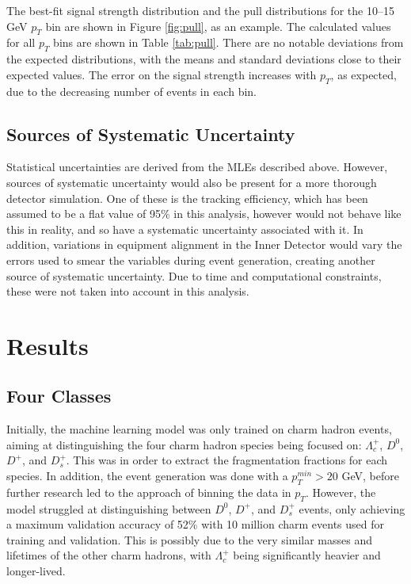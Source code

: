 \documentclass[12pt]{article}
\begin{document}
The best-fit signal strength distribution and the pull distributions for the 10--15 GeV $p_T$ bin are shown in Figure \ref{fig:pull}, as an example. The calculated values for all $p_T$ bins are shown in Table \ref{tab:pull}. There are no notable deviations from the expected distributions, with the means and standard deviations close to their expected values. The error on the signal strength increases with $p_T$, as expected, due to the decreasing number of events in each bin.

\subsection{Sources of Systematic Uncertainty}
Statistical uncertainties are derived from the MLEs described above. However, sources of systematic uncertainty would also be present for a more thorough detector simulation. One of these is the tracking efficiency, which has been assumed to be a flat value of 95\% in this analysis, however would not behave like this in reality, and so have a systematic uncertainty associated with it. In addition, variations in equipment alignment in the Inner Detector would vary the errors used to smear the variables during event generation, creating another source of systematic uncertainty. Due to time and computational constraints, these were not taken into account in this analysis.







\newpage
\section{Results}
\label{sec:results}

\subsection{Four Classes}
Initially, the machine learning model was only trained on charm hadron events, aiming at distinguishing the four charm hadron species being focused on: $\Lambda_c^+$, $D^0$, $D^+$, and $D_s^+$. This was in order to extract the fragmentation fractions for each species. In addition, the event generation was done with a $p_T^{min} > 20$ GeV, before further research led to the approach of binning the data in $p_T$. However, the model struggled at distinguishing between $D^0$, $D^+$, and $D_s^+$ events, only achieving a maximum validation accuracy of 52\% with 10 million charm events used for training and validation. This is possibly due to the very similar masses and lifetimes of the other charm hadrons, with $\Lambda_c^+$ being significantly heavier and longer-lived.
\end{document}

